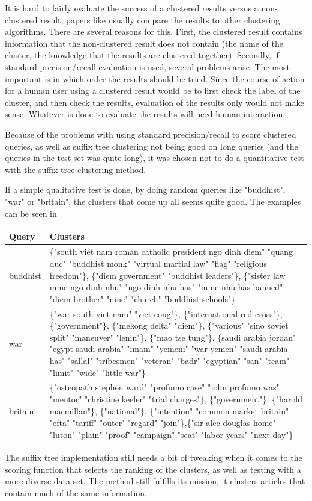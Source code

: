 It is hard to fairly evaluate the success of a clustered results versus a non-clustered result, papers like \cite{zamir} usually compare the results to other clustering algorithms. There are several reasons for this. First, the clustered result contains information that the non-clustered result does not contain (the name of the cluster, the knowledge that the results are clustered together). Secondly, if standard precision/recall evaluation is used, several problems arise. The most important is in which order the results should be tried. Since the course of action for a human user using a clustered result would be to first check the label of the cluster, and then check the results, evaluation of the results only would not make sense. Whatever is done to evaluate the results will need human interaction. 

Because of the problems with using standard precision/recall to score clustered queries, as well as suffix tree clustering not being good on long queries (and the queries in the test set was quite long), it was chosen not to do a quantitative test with the suffix tree clustering method. 

If a simple qualitative test is done, by doing random queries like "buddhist", "war" or "britain", the clusters that come up all seems quite good. The examples can be seen in 

\begin{center}

\begin{tabular}{|l|p{}|}
\hline
Query & Clusters \\
\hline
buddhist & \{"south viet nam roman catholic president ngo dinh diem" "quang duc" "buddhist monk" "virtual martial law" "flag" "religious freedom"\}, \{"diem government" "buddhist leaders"\}, \{"sister law mme ngo dinh nhu" "ngo dinh nhu has" "mme nhu has banned" "diem brother" "nine" "church" "buddhist schools"\}\\ \hline
war & \{"war south viet nam" "viet cong"\}, \{"international red cross"\}, \{"government"\}, \{"mekong delta" "diem"\}, \{"various" "sino soviet split" "maneuver" "lenin"\}, \{"mao tse tung"\}, \{saudi arabia jordan" "egypt saudi arabia" "imam" "yemeni" "war yemen" "saudi arabia has" "sallal" "tribesmen" "veteran" "badr" "egyptian" "san" "team" "limit" "wide" "little war"\}\\ \hline
britain & \{"osteopath stephen ward" "profumo case" "john profumo was" "mentor" "christine keeler" "trial charges"\}, \{"government"\}, \{"harold macmillan"\}, \{"national"\}, \{"intention" "common market britain" "efta" "tariff" "outer" "regard" "join"\},\{"sir alec douglas home" "luton" "plain" "proof" "campaign" "seat" "labor years" "next day"\} \\ \hline

\end{tabular}


\end{center}

The suffix tree implementation still needs a bit of tweaking when it comes to the scoring function that selects the ranking of the clusters, as well as testing with a more diverse data set. The method still fulfills its mission, it clusters articles that contain much of the same information.